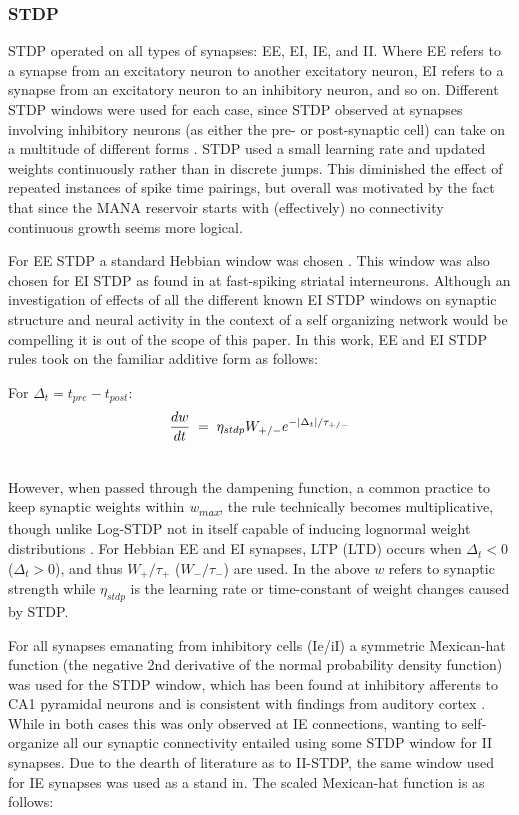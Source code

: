 \documentclass[10pt,letterpaper]{article}
\begin{document}
\subsubsection*{STDP}
				
STDP operated on all types of synapses: EE, EI, IE, and II. Where EE refers to a synapse from an excitatory neuron to another excitatory neuron, EI refers to a synapse from an excitatory neuron to an inhibitory neuron, and so on. Different STDP windows were used for each case, since STDP observed at synapses involving inhibitory neurons (as either the pre- or post-synaptic cell) can take on a multitude of different forms \cite{rubenstein2013neural}\cite{vogels2013inhibitory}. STDP used a small learning rate and updated weights continuously rather than in discrete jumps. This diminished the effect of repeated instances of spike time pairings, but overall was motivated by the fact that since the MANA reservoir starts with (effectively) no connectivity continuous growth seems more logical.

For EE STDP a standard Hebbian window was chosen \cite{bi1998synaptic}. This window was also chosen for EI STDP as found in \cite{fino2008cell} at fast-spiking striatal interneurons. Although an investigation of effects of all the different known EI STDP windows on synaptic structure and neural activity in the context of a self organizing network would be compelling it is out of the scope of this paper. In this work, EE and EI STDP rules took on the familiar additive form as follows:
	
For $\Delta_t = t_{pre} - t_{post}$:
\begin{gather}
	\frac{dw}{dt} \;=\; \eta_{stdp}W_{+/-} e^{-|\Delta_t|/\tau_{+/-}} \\ \notag
\end{gather}
	
However, when passed through the dampening function, a common practice to keep synaptic weights within \emph{w\textsubscript{max}}, the rule technically becomes multiplicative, though unlike Log-STDP not in itself capable of inducing lognormal weight distributions \cite{gilson2011stability}. For Hebbian EE and EI synapses, LTP (LTD) occurs when $\Delta_t < 0$ ($\Delta_t > 0$), and thus $W_+/\tau_+$ ($W_-/\tau_-$) are used. In the above $w$ refers to synaptic strength while $\eta_{stdp}$ is the learning rate or time-constant of weight changes caused by STDP.
	
For all synapses emanating from inhibitory cells (Ie/iI) a symmetric Mexican-hat function (the negative 2nd derivative of the normal probability density function) was used for the STDP window, which has been found at inhibitory afferents to CA1 pyramidal neurons \cite{woodin2003coincident} and is consistent with findings from auditory cortex \cite{d2015inhibitory}. While in both cases this was only observed at IE connections, wanting to self-organize all our synaptic connectivity entailed using some STDP window for II synapses. Due to the dearth of literature as to II-STDP, the same window used for IE synapses was used as a stand in. The scaled Mexican-hat function is as follows: 
	
\end{document}

